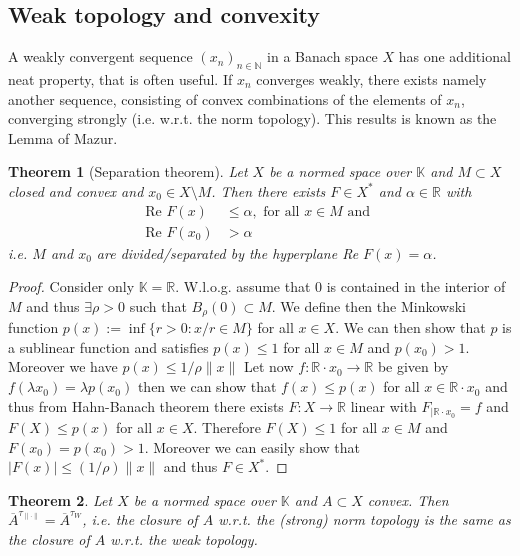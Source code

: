 \documentclass[11pt,a4paper]{article}
\newtheorem{thm}{Theorem}[section]
\theoremstyle{definition}
\begin{document}
\subsection{Weak topology and convexity}
A weakly convergent sequence $(x_n)_{n \in \mathbb{N}}$ in a Banach space $X$ has one additional neat property, that is often useful. If $x_n$ converges weakly, there exists namely another sequence, consisting of convex combinations of the elements of $x_n$, converging strongly (i.e. w.r.t. the norm topology). This results is known as the Lemma of Mazur. 
\begin{thm}[Separation theorem] Let $X$ be a normed space over $\mathbb{K}$ and $M \subset X$ closed and convex and $x_0 \in X \setminus M$. Then there exists $F \in X^*$ and $\alpha \in \mathbb{R}$ with 
\begin{align*}
\text{Re } F(x) &\leq \alpha, \text{ for all } x \in M \text{ and } \\ 
\text{Re } F(x_0) &> \alpha 
\end{align*}
i.e. $M$ and $x_0$ are divided/separated by the hyperplane Re $F(x) = \alpha$. 
\end{thm}
\begin{proof}
Consider only $\mathbb{K}= \mathbb{R}$. 
W.l.o.g. assume that $0$ is contained in the interior of $M$ and thus $\exists \rho >0$ such that $B_\rho(0) \subset M$. We define then the Minkowski function $p(x) := \inf \{ r>0: x/r \in M \}$ for all $x \in X$. We can then show that $p$ is a sublinear function and satisfies $p(x) \leq 1$ for all $x \in M$ and $p(x_0) >1$. Moreover we have $p(x) \leq 1/\rho \| x\|$
\newpage
Let now $f: \mathbb{R} \cdot x_0 \to \mathbb{R}$ be given by $f( \lambda x_0) = \lambda p(x_0)$ then we can show that $f(x) \leq p(x)$ for all $x \in \mathbb{R} \cdot x_0$ and thus from Hahn-Banach theorem there exists $F: X \to \mathbb{R}$ linear with $F_{ \mid \mathbb{R} \cdot x_0 } = f$ and $F(X) \leq p(x)$ for all $x \in X$. Therefore $F(X) \leq 1$ for all $x \in M$ and $F(x_0)= p(x_0) >1$. Moreover we can easily show that $|F(x)| \leq (1/ \rho) \|x\|$ and thus $F \in X^*$. 
\end{proof}
\begin{thm} Let $X$ be a normed space over $\mathbb{K}$ and $A \subset X$ convex. Then $\overline{A}^{\tau_{\| \cdot \|}} = \overline{A}^{ \tau_W}$, i.e. the closure of $A$ w.r.t. the (strong) norm topology is the same as the closure of $A$ w.r.t. the weak topology. 
\end{thm}
\end{document}
